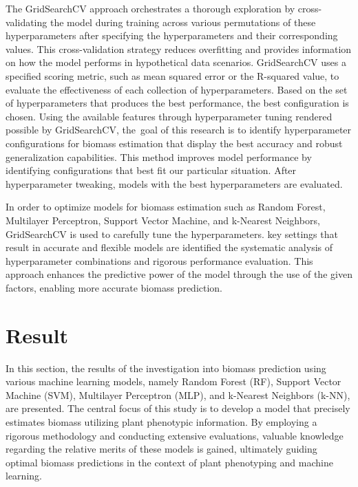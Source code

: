 \documentclass[a4paper,12pt]{report}%
\renewcommand{\\}{\vspace*{0.5\baselineskip} \newline}
\begin{document}
\noindent The GridSearchCV approach orchestrates a thorough exploration by cross-validating the model during training across various permutations of these hyperparameters after specifying the hyperparameters and their corresponding values. This cross-validation strategy reduces overfitting and provides information on how the model performs in hypothetical data scenarios. GridSearchCV uses a specified scoring metric, such as mean squared error or the R-squared value, to evaluate the effectiveness of each collection of hyperparameters. Based on the set of hyperparameters that produces the best performance, the best configuration is chosen.
Using the available features through hyperparameter tuning rendered possible by GridSearchCV, the goal of this research is to identify hyperparameter configurations for biomass estimation that display the best accuracy and robust generalization capabilities. This method improves model performance by identifying configurations that best fit our particular situation. After hyperparameter tweaking, models with the best hyperparameters are evaluated.

\noindent In order to optimize models for biomass estimation such as Random Forest, Multilayer Perceptron, Support Vector Machine, and k-Nearest Neighbors, GridSearchCV is used to carefully tune the hyperparameters. key settings that result in accurate and flexible models are identified the systematic analysis of hyperparameter combinations and rigorous performance evaluation. This approach enhances the predictive power of the model through the use of the given factors, enabling more accurate biomass prediction.

\chapter{Result}
In this section, the results of the investigation into biomass prediction using various machine learning models, namely Random Forest (RF), Support Vector Machine (SVM), Multilayer Perceptron (MLP), and k-Nearest Neighbors (k-NN), are presented. The central focus of this study is to develop a model that precisely estimates biomass utilizing plant phenotypic information. By employing a rigorous methodology and conducting extensive evaluations, valuable knowledge regarding the relative merits of these models is gained, ultimately guiding optimal biomass predictions in the context of plant phenotyping and machine learning.
\end{document}
